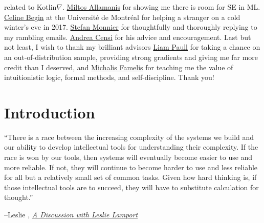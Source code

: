 \documentclass[12pt,initial,twoside,maitrise]{dms}
\numberwithin{equation}{section}
\numberwithin{table}{chapter}
\numberwithin{figure}{chapter}
\begin{document}
related to Kotlin$\nabla$. \href{https://miltos.allamanis.com/}{Miltos Allamanis} for showing me there is room for SE in ML. \href{https://diro.umontreal.ca/accueil/}{Celine Begin} at the Universit\'e de Montr\'eal for helping a stranger on a cold winter's eve in 2017. \href{https://www.iro.umontreal.ca/~monnier/}{Stefan Monnier} for thoughtfully and thoroughly replying to my rambling emails. \href{https://censi.science/}{Andrea Censi} for his advice and encouragement. Last but not least, I wish to thank my brilliant advisors \href{http://liampaull.ca/}{Liam Paull} for taking a chance on an out-of-distribution sample, providing strong gradients and giving me far more credit than I deserved, and \href{https://michalis.famelis.info/}{Michalis Famelis} for teaching me the value of intuitionistic logic, formal methods, and self-discipline. Thank you!


\cleardoublepage
{}  %
\tableofcontents
\cleardoublepage
\listoftables
\cleardoublepage
\listoffigures

\NoChapterPageNumber
\cleardoublepage
{}

\chapter{Introduction}\label{ch:introduction}

\setlength{\epigraphwidth}{0.85\textwidth}
\epigraph{``There is a race between the increasing complexity of the systems we build and our ability to develop intellectual tools for understanding their complexity. If the race is won by our tools, then systems will eventually become easier to use and more reliable. If not, they will continue to become harder to use and less reliable for all but a relatively small set of common tasks. Given how hard thinking is, if those intellectual tools are to succeed, they will have to substitute calculation for thought.''}{\begin{flushright}--Leslie \citet{lamport2002discussion}, \href{https://www.microsoft.com/en-us/research/uploads/prod/2016/12/A-Discussion-With-Leslie-Lamport.pdf}{\textit{A Discussion with Leslie Lamport}}\end{flushright}}
\end{document}
